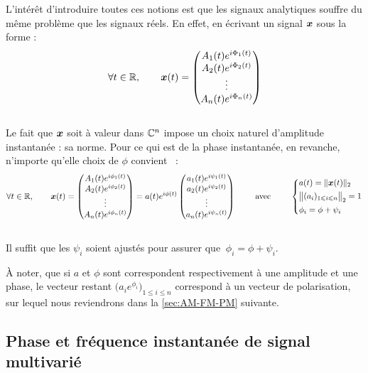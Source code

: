 L'intérêt d'introduire toutes ces notions est que les signaux analytiques souffre du même problème que les signaux réels. 
En effet, en écrivant un signal $\boldsymbol{x}$ sous la forme :
\[\forall t\in\mathbb{R},\qquad 
\boldsymbol{x}(t) = \begin{pmatrix} A_1(t)e^{i\Phi_1(t)} \\ A_2(t)e^{i\Phi_2(t)} \\ \vdots \\ A_n(t)e^{i\Phi_n(t)}
\end{pmatrix}\]
\\
Le fait que $\boldsymbol{x}$ soit à valeur dans $\mathbb{C}^n$ impose un choix naturel d'amplitude instantanée : sa norme. Pour ce qui est de la phase instantanée, en revanche, n'importe qu'elle choix de $\phi$ convient \apriori~:
\[\forall t\in\mathbb{R},\qquad 
\boldsymbol{x}(t) = \begin{pmatrix} A_1(t)e^{i\phi_1(t)} \\ A_2(t)e^{i\phi_2(t)} \\ \vdots \\ A_n(t)e^{i\phi_n(t)} \end{pmatrix}
= a(t)e^{i\phi(t)}\begin{pmatrix} a_1(t)e^{i\psi_1(t)} \\ a_2(t)e^{i\psi_2(t)} \\ \vdots \\ a_n(t)e^{i\psi_n(t)} \end{pmatrix}
\qquad\text{ avec }\qquad 
\left\{ \begin{aligned}
	& a(t) = \| \boldsymbol{x}(t) \|_2 \\
	& \big\|(a_i)_{1\leqslant i\leqslant n}\big\|_2 = 1 \\
	& \phi_i = \phi + \psi_i \end{aligned}\right.\]
\\
Il suffit que les $\psi_i$ soient ajustés pour assurer que $\ \phi_i = \phi + \psi_i$.
\\
\begin{remarque}
	À noter, que si $a$ et $\phi$ sont correspondent respectivement à une amplitude et une phase, le vecteur restant $\big( a_ie^{\phi_i} \big)_{1\leq i\leq n}$ correspond à un vecteur de polarisation, sur lequel nous reviendrons dans la \cref{sec:AM-FM-PM} suivante.
\end{remarque}



\subsection{Phase et fréquence instantanée de signal multivarié }\label{subsec:intro_phased}

